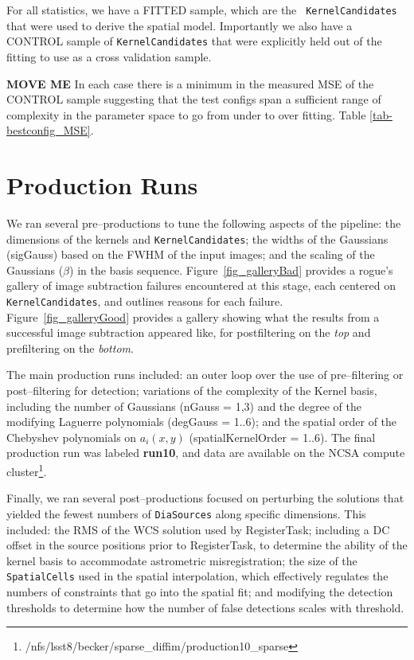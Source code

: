 \documentclass[prd, nofootinbib, floatfix, 11pt,tightenlines,times]{article}
\begin{document}
For all statistics, we have a FITTED sample, which are the {\tt
  KernelCandidates} that were used to derive the spatial model.
Importantly we also have a CONTROL sample of {\tt KernelCandidates}
that were explicitly held out of the fitting to use as a cross
validation sample.

{\bf MOVE ME}
In each case there is a minimum in the measured MSE of the CONTROL sample suggesting
that the test configs span a sufficient range of complexity in the parameter space to 
go from under to over fitting.  Table \ref{tab-bestconfig_MSE}.

\section{Production Runs}

We ran several pre--productions to tune the following aspects of the
pipeline: the dimensions of the kernels and {\tt KernelCandidates};
the widths of the Gaussians (sigGauss) based on the FWHM of the input
images; and the scaling of the Gaussians ($\beta$) in the basis
sequence.  Figure~\ref{fig_galleryBad} provides a rogue's gallery of
image subtraction failures encountered at this stage, each centered on
{\tt KernelCandidates}, and outlines reasons for each failure.
Figure~\ref{fig_galleryGood} provides a gallery showing what the
results from a successful image subtraction appeared like, for
postfiltering on the {\it top} and prefiltering on the {\it bottom}.

The main production runs included: an outer loop over the use of
pre--filtering or post--filtering for detection; variations of the
complexity of the Kernel basis, including the number of Gaussians
(nGauss = 1,3) and the degree of the modifying Laguerre polynomials
(degGauss = 1..6); and the spatial order of the Chebyshev polynomials
on $a_i(x,y)$ (spatialKernelOrder = 1..6).  The final production run
was labeled {\bf run10}, and data are available on the NCSA compute
cluster\footnote{/nfs/lsst8/becker/sparse\_diffim/production10\_sparse}.

Finally, we ran several post--productions focused on perturbing the
solutions that yielded the fewest numbers of {\tt DiaSources} along specific
dimensions.  This included: the RMS of the WCS solution used by
RegisterTask; including a DC offset in the source positions prior to
RegisterTask, to determine the ability of the kernel basis to
accommodate astrometric misregistration; the size of the {\tt
  SpatialCells} used in the spatial interpolation, which effectively
regulates the numbers of constraints that go into the spatial fit; and
modifying the detection thresholds to determine how the number of
false detections scales with threshold.
\end{document}
